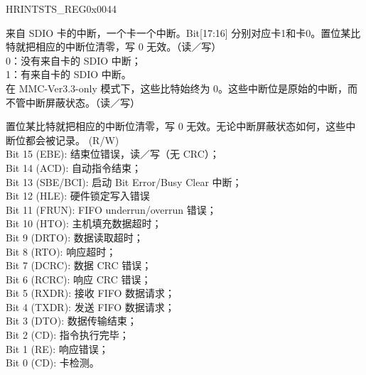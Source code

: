 \begin{register}{H}{RINTSTS\_REG}{0x0044}\label{regdesc:RINTSTSREG}
%
%
%
\regnewline%
\begin{regdesc}\begin{reglist}
\item [SDIO\_INTERRUPT\_RAW]来自 SDIO 卡的中断，一个卡一个中断。Bit[17:16] 分别对应卡1和卡0。置位某比特就把相应的中断位清零，写 0 无效。（读／写）\\
0：没有来自卡的 SDIO 中断；\\
1：有来自卡的 SDIO 中断。\\
在 MMC-Ver3.3-only 模式下，这些比特始终为 0。这些中断位是原始的中断，而不管中断屏蔽状态。（读／写）
\item [INT\_STATUS\_RAW]置位某比特就把相应的中断位清零，写 0 无效。无论中断屏蔽状态如何，这些中断位都会被记录。 (R/W)\\
Bit 15 (EBE): 结束位错误，读／写（无 CRC）；\\
Bit 14 (ACD): 自动指令结束；\\
Bit 13 (SBE/BCI): 启动 Bit Error/Busy Clear 中断；\\
Bit 12 (HLE): 硬件锁定写入错误\\
Bit 11 (FRUN): FIFO underrun/overrun 错误；\\
Bit 10 (HTO): 主机填充数据超时；\\
Bit 9 (DRTO): 数据读取超时；\\
Bit 8 (RTO): 响应超时； \\
Bit 7 (DCRC): 数据 CRC 错误； \\
Bit 6 (RCRC): 响应 CRC 错误； \\
Bit 5 (RXDR): 接收 FIFO 数据请求； \\
Bit 4 (TXDR): 发送 FIFO 数据请求； \\
Bit 3 (DTO): 数据传输结束； \\
Bit 2 (CD): 指令执行完毕； \\
Bit 1 (RE): 响应错误；\\
Bit 0 (CD): 卡检测。
\end{reglist}\end{regdesc}
\end{register}


